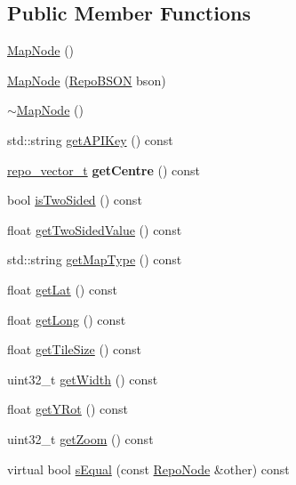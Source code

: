 \subsection*{Public Member Functions}
\begin{DoxyCompactItemize}
\item 
\hyperlink{classrepo_1_1core_1_1model_1_1_map_node_aa4e1fb66b032e08781093ffb7fe03885}{Map\+Node} ()
\item 
\hyperlink{classrepo_1_1core_1_1model_1_1_map_node_a44379bbf090c4ed529c892a6c3482e58}{Map\+Node} (\hyperlink{classrepo_1_1core_1_1model_1_1_repo_b_s_o_n}{Repo\+B\+S\+O\+N} bson)
\item 
\hyperlink{classrepo_1_1core_1_1model_1_1_map_node_a380098b662362882a2d5ca3bd5004fc1}{$\sim$\+Map\+Node} ()
\item 
std\+::string \hyperlink{classrepo_1_1core_1_1model_1_1_map_node_ab17c7f35002dccd86a8d0a0aa137fb29}{get\+A\+P\+I\+Key} () const 
\item 
\hypertarget{classrepo_1_1core_1_1model_1_1_map_node_aa18ba0dc0bf85a2ef4e7499ffbff445c}{}\hyperlink{structrepo__vector__t}{repo\+\_\+vector\+\_\+t} {\bfseries get\+Centre} () const \label{classrepo_1_1core_1_1model_1_1_map_node_aa18ba0dc0bf85a2ef4e7499ffbff445c}

\item 
bool \hyperlink{classrepo_1_1core_1_1model_1_1_map_node_a51180c085b8dc221c57542dcace32b51}{is\+Two\+Sided} () const 
\item 
float \hyperlink{classrepo_1_1core_1_1model_1_1_map_node_a009d9786e3760f21af80bc4b40d12d8a}{get\+Two\+Sided\+Value} () const 
\item 
std\+::string \hyperlink{classrepo_1_1core_1_1model_1_1_map_node_a5a600efde8d866325a144e90b0a0d2c9}{get\+Map\+Type} () const 
\item 
float \hyperlink{classrepo_1_1core_1_1model_1_1_map_node_a1a3b603981a4b51cb69b1b83b793e849}{get\+Lat} () const 
\item 
float \hyperlink{classrepo_1_1core_1_1model_1_1_map_node_a7600f38ebfdffdb89db77f3ea8aa3ca6}{get\+Long} () const 
\item 
float \hyperlink{classrepo_1_1core_1_1model_1_1_map_node_ac9925b3ed29f02187501717e34b564c0}{get\+Tile\+Size} () const 
\item 
uint32\+\_\+t \hyperlink{classrepo_1_1core_1_1model_1_1_map_node_a841b65e0ae5039e638d79d92f4ba01c1}{get\+Width} () const 
\item 
float \hyperlink{classrepo_1_1core_1_1model_1_1_map_node_a10614a78ca490a541b3704214e1ec5cb}{get\+Y\+Rot} () const 
\item 
uint32\+\_\+t \hyperlink{classrepo_1_1core_1_1model_1_1_map_node_aa5409677aba6f413c335d26216fa40d7}{get\+Zoom} () const 
\item 
virtual bool \hyperlink{classrepo_1_1core_1_1model_1_1_map_node_ac27593deef8281f9d70324f2f1f994e9}{s\+Equal} (const \hyperlink{classrepo_1_1core_1_1model_1_1_repo_node}{Repo\+Node} \&other) const 
\end{DoxyCompactItemize}
